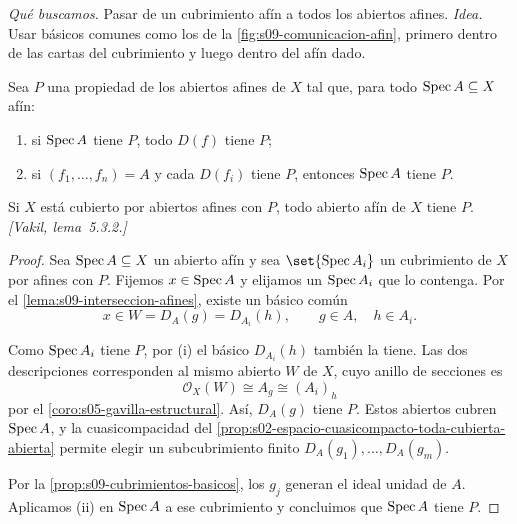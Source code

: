 \emph{Qué buscamos.} Pasar de un cubrimiento afín a todos los abiertos afines. \emph{Idea.} Usar básicos comunes como los de la \cref{fig:s09-comunicacion-afin}, primero dentro de las cartas del cubrimiento y luego dentro del afín dado.

\begin{lema}
\label{lema:s09-comunicacion-afin}
Sea $P$ una propiedad de los abiertos afines de $X$ tal que, para todo $\operatorname{Spec} A\subseteq X$ afín:
\begin{enumerate}[label=(\roman*)]
\item si $\operatorname{Spec} A$ tiene $P$, todo $D(f)$ tiene $P$;
\item si $(f_1,\ldots,f_n)=A$ y cada $D(f_i)$ tiene $P$, entonces $\operatorname{Spec} A$ tiene $P$.
\end{enumerate}
Si $X$ está cubierto por abiertos afines con $P$, todo abierto afín de $X$ tiene $P$. \emph{[Vakil, lema~5.3.2.]}
\end{lema}
\begin{proof}
Sea $\operatorname{Spec} A\subseteq X$ un abierto afín y sea $\set{\Spec A_i}$ un cubrimiento de $X$ por afines con $P$. Fijemos $x\in\operatorname{Spec} A$ y elijamos un $\operatorname{Spec} A_i$ que lo contenga. Por el \cref{lema:s09-interseccion-afines}, existe un básico común
\[
x\in W=D_A(g)=D_{A_i}(h),\qquad g\in A,\quad h\in A_i.
\]

Como $\operatorname{Spec} A_i$ tiene $P$, por (i) el básico $D_{A_i}(h)$ también la tiene. Las dos descripciones corresponden al mismo abierto $W$ de $X$, cuyo anillo de secciones es
\[
\mathcal O_X(W)\cong A_g\cong(A_i)_h
\]
por el \cref{coro:s05-gavilla-estructural}. Así, $D_A(g)$ tiene $P$. Estos abiertos cubren $\operatorname{Spec} A$, y la cuasicompacidad del \cref{prop:s02-espacio-cuasicompacto-toda-cubierta-abierta} permite elegir un subcubrimiento finito $D_A(g_1),\ldots,D_A(g_m)$.

Por la \cref{prop:s09-cubrimientos-basicos}, los $g_j$ generan el ideal unidad de $A$. Aplicamos (ii) en $\operatorname{Spec} A$ a ese cubrimiento y concluimos que $\operatorname{Spec} A$ tiene $P$.
\end{proof}

